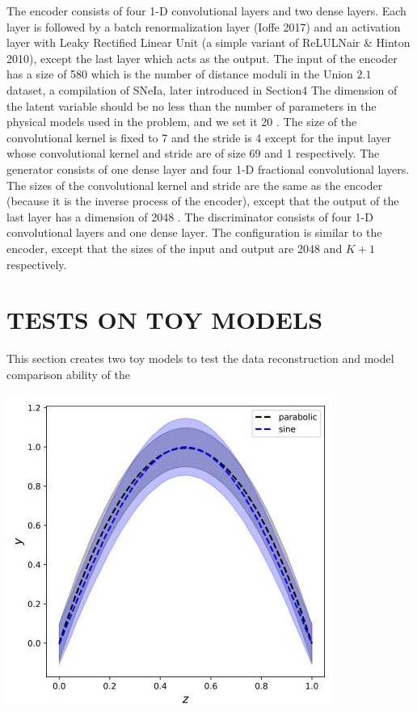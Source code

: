 \documentclass[10pt]{article}
\begin{document}
The encoder consists of four 1-D convolutional layers and two dense layers. Each layer is followed by a batch renormalization layer (Ioffe 2017) and an activation layer with Leaky Rectified Linear Unit (a simple variant of ReLULNair \& Hinton 2010), except the last layer which acts as the output. The input of the encoder has a size of 580 which is the number of distance moduli in the Union $2.1$ dataset, a compilation of SNeIa, later introduced in Section4 The dimension of the latent variable should be no less than the number of parameters in the physical models used in the problem, and we set it 20 . The size of the convolutional kernel is fixed to 7 and the stride is 4 except for the input layer whose convolutional kernel and stride are of size 69 and 1 respectively. The generator consists of one dense layer and four 1-D fractional convolutional layers. The sizes of the convolutional kernel and stride are the same as the encoder (because it is the inverse process of the encoder), except that the output of the last layer has a dimension of 2048 . The discriminator consists of four 1-D convolutional layers and one dense layer. The configuration is similar to the encoder, except that the sizes of the input and output are 2048 and $K+1$ respectively.

\section{TESTS ON TOY MODELS}
This section creates two toy models to test the data reconstruction and model comparison ability of the

\includegraphics[max width=\textwidth]{2022_04_28_9be604c658276336b08cg-06}
\end{document}
